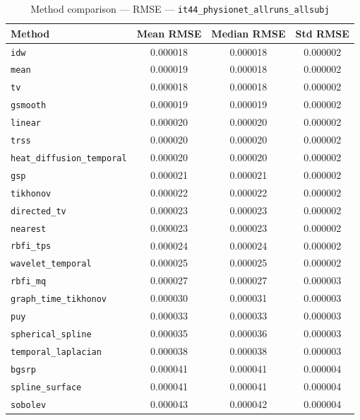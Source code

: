\begin{table}[ht]
\centering
\caption{Method comparison — RMSE — \texttt{it44_physionet_allruns_allsubj}}
\label{tab:rmse_it44_physionet_allruns_allsubj}
\begin{tabular}{lccc}
\hline
Method & Mean RMSE & Median RMSE & Std RMSE \\
\hline
\texttt{idw} & 0.000018 & 0.000018 & 0.000002 \\
\texttt{mean} & 0.000019 & 0.000018 & 0.000002 \\
\texttt{tv} & 0.000018 & 0.000018 & 0.000002 \\
\texttt{gsmooth} & 0.000019 & 0.000019 & 0.000002 \\
\texttt{linear} & 0.000020 & 0.000020 & 0.000002 \\
\texttt{trss} & 0.000020 & 0.000020 & 0.000002 \\
\texttt{heat_diffusion_temporal} & 0.000020 & 0.000020 & 0.000002 \\
\texttt{gsp} & 0.000021 & 0.000021 & 0.000002 \\
\texttt{tikhonov} & 0.000022 & 0.000022 & 0.000002 \\
\texttt{directed_tv} & 0.000023 & 0.000023 & 0.000002 \\
\texttt{nearest} & 0.000023 & 0.000023 & 0.000002 \\
\texttt{rbfi_tps} & 0.000024 & 0.000024 & 0.000002 \\
\texttt{wavelet_temporal} & 0.000025 & 0.000025 & 0.000002 \\
\texttt{rbfi_mq} & 0.000027 & 0.000027 & 0.000003 \\
\texttt{graph_time_tikhonov} & 0.000030 & 0.000031 & 0.000003 \\
\texttt{puy} & 0.000033 & 0.000033 & 0.000003 \\
\texttt{spherical_spline} & 0.000035 & 0.000036 & 0.000003 \\
\texttt{temporal_laplacian} & 0.000038 & 0.000038 & 0.000003 \\
\texttt{bgsrp} & 0.000041 & 0.000041 & 0.000004 \\
\texttt{spline_surface} & 0.000041 & 0.000041 & 0.000004 \\
\texttt{sobolev} & 0.000043 & 0.000042 & 0.000004 \\
\hline
\end{tabular}
\end{table}

